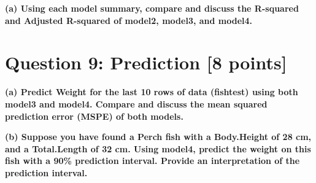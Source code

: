 \documentclass[
]{article}
\begin{document}
\textbf{(a) Using each model summary, compare and discuss the R-squared
and Adjusted R-squared of model2, model3, and model4.}

\hypertarget{question-9-prediction-8-points}{%
\section{Question 9: Prediction {[}8
points{]}}\label{question-9-prediction-8-points}}

\textbf{(a) Predict Weight for the last 10 rows of data (fishtest) using
both model3 and model4. Compare and discuss the mean squared prediction
error (MSPE) of both models.}

\textbf{(b) Suppose you have found a Perch fish with a Body.Height of 28
cm, and a Total.Length of 32 cm. Using model4, predict the weight on
this fish with a 90\% prediction interval. Provide an interpretation of
the prediction interval.}
\end{document}
